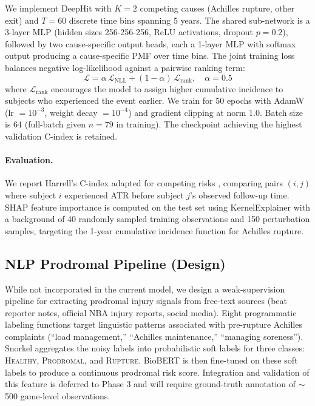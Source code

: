 \documentclass{article}
\begin{document}
We implement DeepHit \citep{lee2018deephit} with $K=2$ competing causes
(Achilles rupture, other exit) and $T=60$ discrete time bins spanning 5 years.
The shared sub-network is a 3-layer MLP (hidden sizes 256-256-256, ReLU
activations, dropout $p=0.2$), followed by two cause-specific output heads, each
a 1-layer MLP with softmax output producing a cause-specific PMF over time bins.
The joint training loss balances negative log-likelihood against a pairwise
ranking term:
\begin{equation}
  \mathcal{L} = \alpha\,\mathcal{L}_{\text{NLL}} + (1-\alpha)\,\mathcal{L}_{\text{rank}},
  \quad \alpha = 0.5
  \label{eq:loss}
\end{equation}
where $\mathcal{L}_{\text{rank}}$ encourages the model to assign higher
cumulative incidence to subjects who experienced the event earlier.  We train
for 50 epochs with AdamW (lr $= 10^{-3}$, weight decay $= 10^{-4}$) and
gradient clipping at norm 1.0.  Batch size is 64 (full-batch given $n=79$ in
training).  The checkpoint achieving the highest validation C-index is retained.

\paragraph{Evaluation.}
We report Harrell's C-index adapted for competing risks \citep{lee2018deephit},
comparing pairs $(i,j)$ where subject $i$ experienced ATR before subject $j$'s
observed follow-up time.  SHAP feature importance is computed on the test set
using KernelExplainer \citep{lundberg2017shap} with a background of 40 randomly
sampled training observations and 150 perturbation samples, targeting the
1-year cumulative incidence function for Achilles rupture.

\subsection{NLP Prodromal Pipeline (Design)}
\label{sec:nlp}

While not incorporated in the current model, we design a weak-supervision
pipeline \citep{ratner2017snorkel} for extracting prodromal injury signals from
free-text sources (beat reporter notes, official NBA injury reports, social
media).  Eight programmatic labeling functions target linguistic patterns
associated with pre-rupture Achilles complaints (``load management,''
``Achilles maintenance,'' ``managing soreness'').  Snorkel aggregates the
noisy labels into probabilistic soft labels for three classes:
\textsc{Healthy}, \textsc{Prodromal}, and \textsc{Rupture}.  BioBERT
\citep{lee2020biobert} is then fine-tuned on these soft labels to produce a
continuous prodromal risk score.  Integration and validation of this feature is
deferred to Phase 3 and will require ground-truth annotation of $\sim$500
game-level observations.
\end{document}
